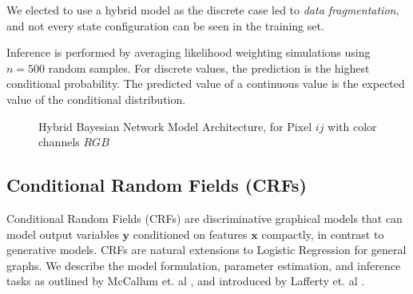 \documentclass{article}
\begin{document}
We elected to use a hybrid model as the discrete case led to
\textit{data fragmentation}, and not every state configuration can be seen
in the training set.

Inference is performed by averaging likelihood weighting simulations using
$n=500$ random samples. For discrete values, the prediction is the highest
conditional probability. The predicted value of a continuous value is the
expected value of the conditional distribution.

\begin{figure}
  \centering
  \caption{Hybrid Bayesian Network Model Architecture, for Pixel $ij$ with color channels $RGB$}
  \label{fig:net-structure}
\end{figure}

\subsection{Conditional Random Fields (CRFs)}
\label{sec:CRF}
Conditional Random Fields (CRFs) are discriminative graphical models that
can model output variables $\mathbf{y}$ conditioned on features $\mathbf{x}$
compactly, in contrast to generative models. CRFs are natural extensions
to Logistic Regression for general graphs. We describe the model formulation,
parameter estimation, and inference tasks as outlined by McCallum et. al \cite{McCallumCRF},
and introduced by Lafferty et. al \cite{CRF}.
\end{document}
